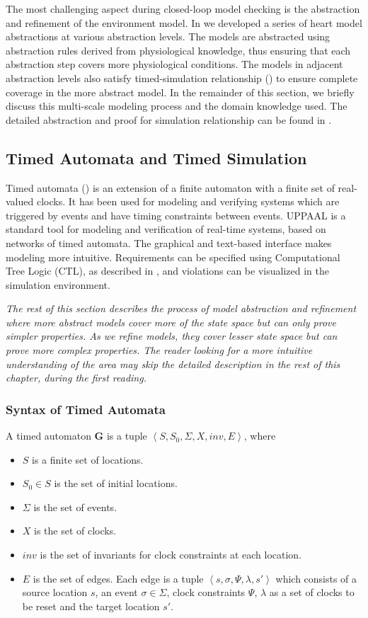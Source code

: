 The most challenging aspect during closed-loop model checking is the abstraction and refinement of the environment model. In \cite{STTT13} we developed a series of heart model abstractions at various abstraction levels. The models are abstracted using abstraction rules derived from physiological knowledge, thus ensuring that each abstraction step covers more physiological conditions. The models in adjacent abstraction levels also satisfy \textsf{timed-simulation} relationship (\cite{simulation}) to ensure complete coverage in the more abstract model. In the remainder of this section, we briefly discuss this multi-scale modeling process and the domain knowledge used. The detailed abstraction and proof for simulation relationship can be found in \cite{STTT13}.

\subsection{Timed Automata and Timed Simulation}
Timed automata (\cite{timed_automata}) is an extension of a finite automaton with a finite set of real-valued clocks. It has been used for modeling and verifying systems which are triggered by events and have timing constraints between events.  UPPAAL is a standard tool for modeling and verification of real-time systems, based on networks of timed automata. The graphical and text-based interface makes modeling more intuitive. Requirements can be specified using Computational Tree Logic (CTL), as described in \cite{Clarke}, and violations can be visualized in the simulation environment.

\emph{The rest of this section describes the process of model abstraction and refinement where more abstract models cover more of the state space but can only prove simpler properties. As we refine models, they cover lesser state space but can prove more complex properties. The reader looking for a more intuitive understanding of the area may skip the detailed description in the rest of this chapter, during the first reading.}
\subsubsection{Syntax of Timed Automata}
A timed automaton \textbf{G} is a tuple $\left\langle S,S_0,\Sigma,X,inv,E\right\rangle$, where

\begin{itemize}
	\item $S$ is a finite set of locations.
	\item $S_0\in S$ is the set of initial locations.
	\item $\Sigma$ is the set of events.
	\item $X$ is the set of clocks.
	\item $inv$ is the set of invariants for clock constraints at each location.
	\item $E$ is the set of edges. Each edge is a tuple $\left\langle s,\sigma,\Psi,\lambda,s'\right\rangle$ which consists of a source location $s$, an event $\sigma\in\Sigma$, clock constraints $\Psi$, $\lambda$ as a set of clocks to be reset and the target location $s'$.   
\end{itemize}

